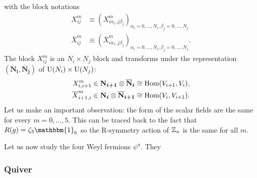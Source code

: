 \documentclass[a4paper,10pt]{article}
\begin{document}
            with the block notations
            \begin{align*}
                X^m_{ij}&\equiv (X^m_{i\alpha_i,j\beta_j})_{\alpha_i=0,\dots,N_i,\beta_j=0,\dots,N_j}\\
                \bar{X}^m_{ij}&\equiv (\bar{X}^m_{i\alpha_i,j\beta_j})_{\alpha_i=0,\dots,N_i,\beta_j=0,\dots,N_j}.
            \end{align*}
            The block $X^m_{ij}$ is an $N_i\times N_j$ block and transforms under the representation $(\boldsymbol{\textbf{N}_i},\boldsymbol{\bar{\textbf{N}}_j})$ of $\text{U}(N_i)\times\text{U}(N_j)$:
            \begin{align}
                X^m_{i,i+1} &\in \boldsymbol{\textbf{N}_{i+1}}\otimes\boldsymbol{\overline{\textbf{N}}_i} \cong \text{Hom}(V_{i+1},V_i),\\
                \overline{X}^m_{i+1,i} &\in \boldsymbol{\textbf{N}_{i}}\otimes\boldsymbol{\overline{\textbf{N}}_{i+1}} \cong \text{Hom}(V_{i},V_{i+1}).
            \end{align}
            Let us make an important observation: the form of the scalar fields are the same for every $m=0,\dots,5$. This can be traced back to the fact that $R(g)=\zeta_3\mathbbm{1}_6$ so the R-symmetry action of $\mathbb{Z}_n$ is the same for all $m$.

            Let us now study the four Weyl fermions $\psi^a$. They 

        \subsubsection{Quiver}
\end{document}
